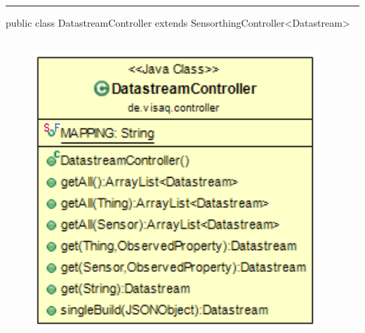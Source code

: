 \rule{\textwidth}{0.4pt}
public class DatastreamController extends SensorthingController<Datastream>
\\\\
\begin{minipage}{0.4\textwidth}
    \begin{figure}[H]
        {\centering\includegraphics[width=0.95\textwidth]{media/backend/controller/classes/DatastreamController.png}}
    \end{figure}
    \end{minipage} \hfill
\begin{minipage}{0.6\textwidth}
\end{minipage}

